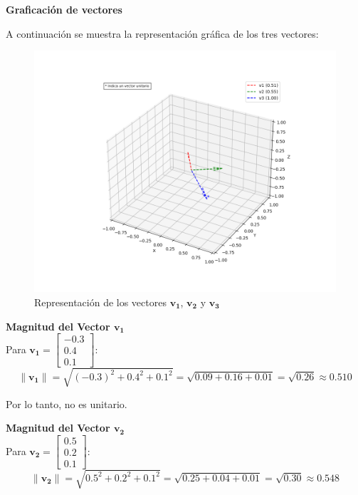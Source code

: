 \documentclass[12 pt]{article}
\begin{document}
\textbf{Graficación de vectores}

A continuación se muestra la representación gráfica de los tres vectores:\\

\begin{figure}[H]
    \centering
    \includegraphics[width=\linewidth]{img/vectors1.png}
    \caption{Representación de los vectores $\mathbf{v_1}$, $\mathbf{v_2}$ y $\mathbf{v_3}$}
    \label{fig:vectors1}
\end{figure}

\textbf{Magnitud del Vector \(\mathbf{v_1}\)}\\

Para \(\mathbf{v_1} = \begin{bmatrix} -0.3 \\ 0.4 \\ 0.1 \end{bmatrix}\):
\[
\|\mathbf{v_1}\| = \sqrt{(-0.3)^2 + 0.4^2 + 0.1^2}
= \sqrt{0.09 + 0.16 + 0.01}
= \sqrt{0.26}
\approx 0.510
\]

\begin{center}
Por lo tanto, no es unitario.\\
\end{center}

\textbf{Magnitud del Vector \(\mathbf{v_2}\)}\\

Para \(\mathbf{v_2} = \begin{bmatrix} 0.5 \\ 0.2 \\ 0.1 \end{bmatrix}\):
\[
\|\mathbf{v_2}\| = \sqrt{0.5^2 + 0.2^2 + 0.1^2}
= \sqrt{0.25 + 0.04 + 0.01}
= \sqrt{0.30}
\approx 0.548
\]
\end{document}
